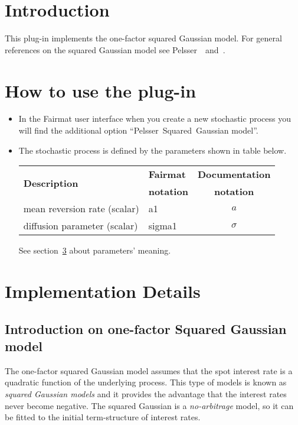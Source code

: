 \newcommand{\pluginName}{Pelsser Model}
\newcommand{\pluginVersion}{1.0.11}


\usepackage{comment}


\PluginTitle{\pluginName}{\pluginVersion}

\section{Introduction}
This plug-in implements the one-factor squared Gaussian model. For general references on the squared Gaussian model see Pelsser~\cite{BookPelsser}~and~\cite{ArtPelsser}.
\section{How to use the plug-in}
\begin{itemize}
  \item In the Fairmat user interface when you create a new stochastic process you will find the additional option ``Pelsser~Squared~Gaussian model''.
  \item The stochastic process is defined by the parameters shown in table below.

\begin{center}
\begin{tabular}{|l|l|c|}
  \hline
 \multirow{2}{*}{\textbf{Description}}& \textbf{Fairmat}&\textbf{Documentation}\\
                     & \textbf{notation}&\textbf{notation}\\
                     \hline
 mean reversion rate    (scalar)        & a1        & $a$\\
 diffusion parameter    (scalar)        & sigma1    & $\sigma$\\
   \hline
\end{tabular}
\end{center}
See section~\ref{id} about parameters' meaning.
\end{itemize}

\section{Implementation Details}
\label{id}

\subsection{Introduction on one-factor Squared Gaussian model}
The one-factor squared Gaussian model assumes that the spot interest rate is a quadratic function of the underlying process. This type of models is known as \emph{squared Gaussian models} and it provides the advantage that the interest rates never become negative. The squared Gaussian is a \emph{no-arbitrage} model, so it can be fitted to the initial term-structure of interest rates.

